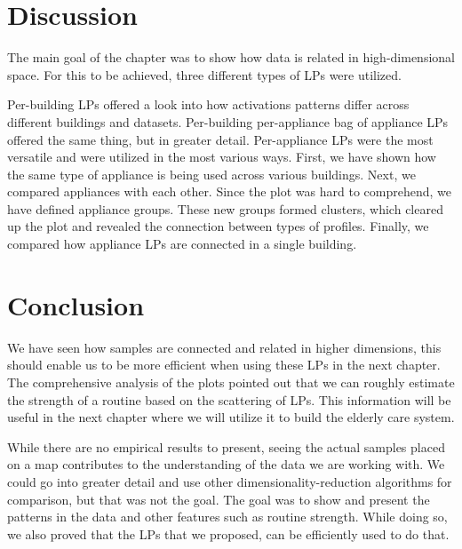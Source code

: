 \section{Discussion}

The main goal of the chapter was to show how data is related in high-dimensional space.
For this to be achieved, three different types of LPs were utilized. 

Per-building LPs offered a look into how activations patterns differ across different buildings and datasets.
Per-building per-appliance bag of appliance LPs offered the same thing, but in greater detail.
Per-appliance LPs were the most versatile and were utilized in the most various ways.
First, we have shown how the same type of appliance is being used across various buildings.
Next, we compared appliances with each other. 
Since the plot was hard to comprehend, we have defined appliance groups.
These new groups formed clusters, which cleared up the plot and revealed the connection between types of profiles. 
Finally, we compared how appliance LPs are connected in a single building. 

\section{Conclusion}

We have seen how samples are connected and related in higher dimensions, this should enable us to be more efficient when using these LPs in the next chapter. 
The comprehensive analysis of the plots pointed out that we can roughly estimate the strength of a routine based on the scattering of LPs.
This information will be useful in the next chapter where we will utilize it to build the elderly care system.

While there are no empirical results to present, seeing the actual samples placed on a map contributes to the understanding of the data we are working with.
We could go into greater detail and use other dimensionality-reduction algorithms for comparison, but that was not the goal.
The goal was to show and present the patterns in the data and other features such as routine strength.
While doing so, we also proved that the LPs that we proposed, can be efficiently used to do that.


